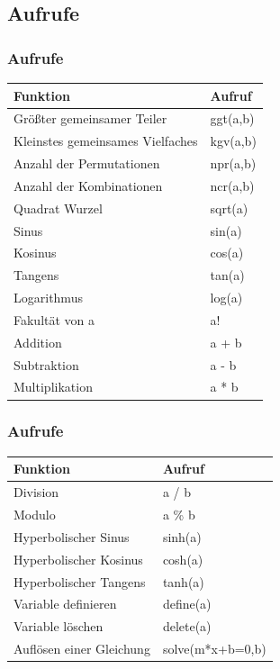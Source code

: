 \documentclass{beamer}
\begin{document}
\subsection{Aufrufe}
\begin{frame}\frametitle{Aufrufe}
 	  \begin{tabular}[b]{l|l}
	    Funktion					&	Aufruf	\\
	    \hline
	    Gr\"o\ss{}ter gemeinsamer Teiler		&	ggt(a,b)	\\
	    Kleinstes gemeinsames Vielfaches		&	kgv(a,b)	\\
	    Anzahl der Permutationen	        	&	npr(a,b)\\  
	    Anzahl der Kombinationen 			&	ncr(a,b) \\
	    Quadrat Wurzel				&	sqrt(a)	\\
	    Sinus					& 	sin(a) \\
	    Kosinus					&	cos(a)	\\
	    Tangens					&	tan(a)	\\
	    Logarithmus					&	log(a)	\\
	    Fakult\"at von a				&	a! \\
	    Addition					&	a + b \\
	    Subtraktion					&	a - b \\
	    Multiplikation				&	a * b \\	
	    \hline
	    \end{tabular}
\end{frame}
\begin{frame}\frametitle{Aufrufe}
 	  \begin{tabular}[b]{l|l}
	    Funktion					&	Aufruf	\\
	    \hline
	    Division					&	a / b \\
	    Modulo					&	a \% b\\
	    Hyperbolischer Sinus			&	sinh(a)\\
	    Hyperbolischer Kosinus			& 	cosh(a)\\
	    Hyperbolischer Tangens			& 	tanh(a)\\
	    Variable definieren				&	define(a)\\
	    Variable l\"oschen				&	delete(a)\\
	    Aufl\"osen einer Gleichung			&	solve(m*x+b=0,b)\\
	    \hline
	    \end{tabular}
\end{frame}
\end{document}
